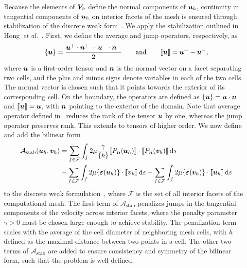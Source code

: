 \documentclass{WileyMSP-template}
\begin{document}
Because the elements of $\bm{V}_h$ define the normal components of $\bm{u}_h$,
continuity in tangential components of $\bm{u}_h$ on interior facets of
the mesh is ensured through stabilization
of the discrete weak form~.
We apply the stabilization outlined in Hong~\emph{et al.}~\cite{Hong2016AEquations}.
First, we define the average and jump operators, respectively, as
\begin{equation}
    \{\bm{u}\} = \frac{\bm{u}^+\cdot\bm{n}^+ - \bm{u}^-\cdot\bm{n}^-}{2}
    \qquad\mathrm{and}\qquad \llbracket\bm{u}\rrbracket = \bm{u}^+ - \bm{u}^-,
    \label{eq:operators_BDM}
\end{equation}
where $\bm{u}$ is a first-order tensor and 
$\bm{n}$ is the normal vector on a facet separating two cells,
and the plus and minus signs denote variables in each of the two cells.
The normal vector is chosen such that it points towards the exterior of
its corresponding cell. On the boundary, the operators are defined as
$\{\bm{u}\} = \bm{u}\cdot\bm{n}$ and $\llbracket\bm{u}\rrbracket = \bm{u}$,
with $\bm{n}$ pointing to the exterior of the domain. Note that average operator
defined in~ reduces the rank of the tensor $\bm{u}$ by one,
whereas the jump operator preserves rank. This extends to tensors of higher order.
We now define and add the bilinear form
\begin{align*}
    \mathcal{A}_{\mathrm{stab}}(\bm{u}_h, \bm{v}_h) &=
    \sum_{f\in \mathcal{F}}\int_f{2\mu\frac{\gamma}{\{h\}}\llbracket P_{\bm{n}}(\bm{u}_h)\rrbracket
    \cdot\llbracket P_{\bm{n}}(\bm{v}_h)\rrbracket}\,\mathrm ds\\
    &-\sum_{f\in \mathcal{F}}\int_f{2\mu\{\bm{\varepsilon}(\bm{u}_h)\}\cdot\llbracket\bm{v}_h\rrbracket}\,\mathrm ds
    -\sum_{f\in \mathcal{F}}\int_f{2\mu\{\bm{\varepsilon}(\bm{v}_h)\}\cdot\llbracket\bm{u}_h\rrbracket}\,\mathrm ds
\end{align*}
to the discrete weak formulation~,
where $\mathcal{F}$ is the set of all interior facets of the computational mesh.
The first term of $\mathcal{A}_{\mathrm{stab}}$ penalizes jumps
in the tangential components of the velocity
across interior facets, where the penalty parameter $\gamma>0$ must be chosen large enough
to achieve stability. The penalization term
scales with the average of the cell diameter of neighboring mesh cells,
with $h$ defined as the maximal distance between two points in a cell. The other two terms
of $\mathcal{A}_{\mathrm{stab}}$ are added to ensure consistency and symmetry of
the bilinear form, such that the problem is well-defined.
\end{document}
